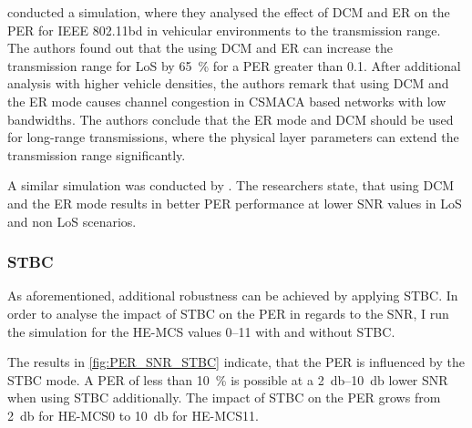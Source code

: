 \textcite{jacob_system-level_2020} conducted a simulation, where they analysed the effect of \ac{DCM} and \ac{ER} on the \ac{PER} for
IEEE 802.11bd in vehicular environments to the transmission range. The authors found out that the using \ac{DCM} and \ac{ER} can
increase the transmission range for \ac{LoS} by \SI{65}{\percent} for a \ac{PER} greater than \num{0.1}. After additional analysis with higher
vehicle densities, the authors remark that using \ac{DCM} and the \ac{ER} mode causes channel congestion in \ac{CSMACA} based
networks with low bandwidths. The authors conclude that the \ac{ER} mode and \ac{DCM} should be used for long-range transmissions, where
the physical layer parameters can extend the transmission range significantly.

A similar simulation was conducted by \textcite{triwinarko_phy_2021}. The researchers state, that using \ac{DCM} and the
\ac{ER} mode results in better \ac{PER} performance at lower \ac{SNR} values in \ac{LoS} and non \ac{LoS} scenarios.

\subsubsection*{\acf{STBC}}
As aforementioned, additional robustness can be achieved by applying \ac{STBC}. In order to analyse the impact of \ac{STBC} on the \ac{PER} in regards to the \ac{SNR},
I run the simulation for the HE-MCS values \numrange{0}{11} with and without \ac{STBC}.

The results in \autoref{fig:PER_SNR_STBC} indicate, that the \ac{PER} is influenced
by the \ac{STBC} mode. A \ac{PER} of less than \SI{10}{\percent} is possible at a \SIrange{2}{10}{\decibel} lower \ac{SNR} when using \ac{STBC} additionally.
The impact of \ac{STBC} on the \ac{PER} grows from \SI{2}{\decibel} for HE-MCS\num{0} to \SI{10}{\decibel} for HE-MCS\num{11}.

